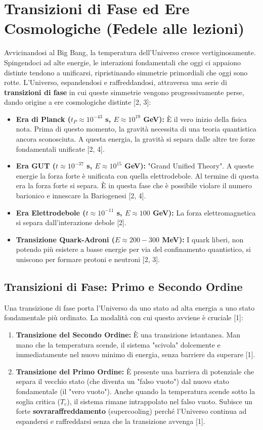 \documentclass[11pt,a4paper]{report}
\begin{document}
\section{Transizioni di Fase ed Ere Cosmologiche (Fedele alle lezioni)}

Avvicinandosi al Big Bang, la temperatura dell'Universo cresce vertiginosamente. Spingendoci ad alte energie, le interazioni fondamentali che oggi ci appaiono distinte tendono a unificarsi, ripristinando simmetrie primordiali che oggi sono rotte. L'Universo, espandendosi e raffreddandosi, attraversa una serie di \textbf{transizioni di fase} in cui queste simmetrie vengono progressivamente perse, dando origine a ere cosmologiche distinte [2, 3]:
\begin{itemize}
    \item \textbf{Era di Planck ($t_P \approx 10^{-43}$ s, $E \approx 10^{19}$ GeV):} È il vero inizio della fisica nota. Prima di questo momento, la gravità necessita di una teoria quantistica ancora sconosciuta. A questa energia, la gravità si separa dalle altre tre forze fondamentali unificate [2, 4].
    \item \textbf{Era GUT ($t \approx 10^{-37}$ s, $E \approx 10^{15}$ GeV):} "Grand Unified Theory". A queste energie la forza forte è unificata con quella elettrodebole. Al termine di questa era la forza forte si separa. È in questa fase che è possibile violare il numero barionico e innescare la Bariogenesi [2, 4].
    \item \textbf{Era Elettrodebole ($t \approx 10^{-11}$ s, $E \approx 100$ GeV):} La forza elettromagnetica si separa dall'interazione debole [2].
    \item \textbf{Transizione Quark-Adroni ($E \approx 200-300$ MeV):} I quark liberi, non potendo più esistere a basse energie per via del confinamento quantistico, si uniscono per formare protoni e neutroni [2, 3].
\end{itemize}

\subsection{Transizioni di Fase: Primo e Secondo Ordine}
Una transizione di fase porta l'Universo da uno stato ad alta energia a uno stato fondamentale più ordinato. La modalità con cui questo avviene è cruciale [1]:
\begin{enumerate}
    \item \textbf{Transizione del Secondo Ordine:} È una transizione istantanea. Man mano che la temperatura scende, il sistema "scivola" dolcemente e immediatamente nel nuovo minimo di energia, senza barriere da superare [1].
    \item \textbf{Transizione del Primo Ordine:} È presente una barriera di potenziale che separa il vecchio stato (che diventa un "falso vuoto") dal nuovo stato fondamentale (il "vero vuoto"). Anche quando la temperatura scende sotto la soglia critica ($T_c$), il sistema rimane intrappolato nel falso vuoto. Subisce un forte \textbf{sovraraffreddamento} (supercooling) perché l'Universo continua ad espandersi e raffreddarsi senza che la transizione avvenga [1].
\end{enumerate}
\end{document}
